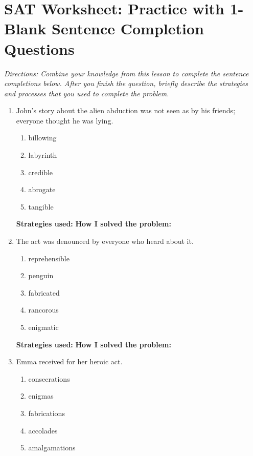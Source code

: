 \section{SAT Worksheet: Practice with 1-Blank Sentence Completion Questions}

\textit{Directions: Combine your knowledge from this lesson to complete the sentence completions below. After you finish the question, briefly describe the strategies and processes that you used to complete the problem.}

\begin{enumerate}


\item John’s story about the alien abduction was not seen as by \underline{\hspace{2in}} his friends; everyone thought he was lying.

\begin{enumerate}[label=(\Alph*)]
\item billowing  
\item labyrinth 
\item credible
\item abrogate 
\item tangible 
\end{enumerate}

\large{\textbf{Strategies used:}} \hrulefill
\large{\textbf{How I solved the problem:}} \hrulefill

\item The \underline{\hspace{2in}} act was denounced by everyone who heard about it.

\begin{enumerate}[label=(\Alph*)] 
\item reprehensible
\item penguin  
\item fabricated
\item rancorous 
\item enigmatic   
\end{enumerate}

\large{\textbf{Strategies used:}} \hrulefill
\large{\textbf{How I solved the problem:}} \hrulefill

\item Emma received \underline{\hspace{2in}} for her heroic act.
 
\begin{enumerate} [label=(\Alph*)]
\item consecrations 
\item enigmas 
\item fabrications 
\item accolades 
\item amalgamations  
\end{enumerate}


\end{enumerate}
